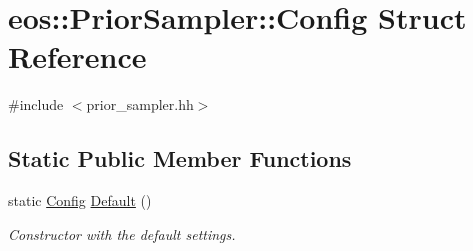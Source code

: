 \hypertarget{structeos_1_1PriorSampler_1_1Config}{
\section{eos::PriorSampler::Config Struct Reference}
\label{structeos_1_1PriorSampler_1_1Config}
}


{\ttfamily \#include $<$prior\_\-sampler.hh$>$}\subsection*{Static Public Member Functions}
\begin{DoxyCompactItemize}
\item 
static \hyperlink{structeos_1_1PriorSampler_1_1Config}{Config} \hyperlink{structeos_1_1PriorSampler_1_1Config_ab56ba1088eae165d73629213c7e72450}{Default} ()
\begin{DoxyCompactList}\small\item\em Constructor with the default settings. \item\end{DoxyCompactList}\end{DoxyCompactItemize}
